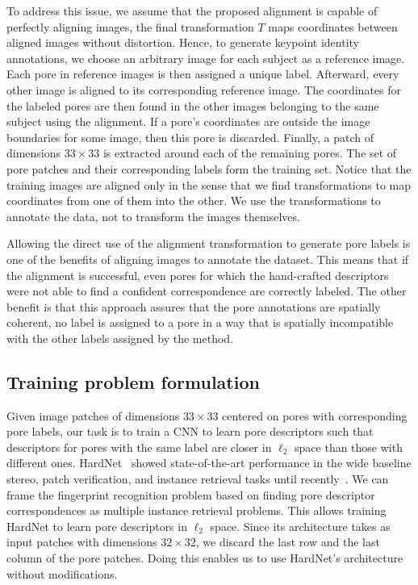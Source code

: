 \documentclass[10pt,twocolumn,letterpaper]{article}
\begin{document}
To address this issue, we assume that the proposed alignment is capable of perfectly aligning images, \ie the final transformation $T$ maps coordinates between aligned images without distortion.
Hence, to generate keypoint identity annotations, we choose an arbitrary image for each subject as a reference image.
Each pore in reference images is then assigned a unique label.
Afterward, every other image is aligned to its corresponding reference image.
The coordinates for the labeled pores are then found in the other images belonging to the same subject using the alignment.
If a pore's coordinates are outside the image boundaries for some image, then this pore is discarded.
Finally, a patch of dimensions ${33 \times 33}$ is extracted around each of the remaining pores.
The set of pore patches and their corresponding labels form the training set.
Notice that the training images are aligned only in the sense that we find transformations to map coordinates from one of them into the other.
We use the transformations to annotate the data, not to transform the images themselves.

Allowing the direct use of the alignment transformation to generate pore labels is one of the benefits of aligning images to annotate the dataset.
This means that if the alignment is successful, even pores for which the hand-crafted descriptors were not able to find a confident correspondence are correctly labeled.
The other benefit is that this approach assures that the pore annotations are spatially coherent, \ie no label is assigned to a pore in a way that is spatially incompatible with the other labels assigned by the method.

\subsection{Training problem formulation}
\label{sec:desc-train}

Given image patches of dimensions ${33 \times 33}$ centered on pores with corresponding pore labels, our task is to train a CNN to learn pore descriptors such that descriptors for pores with the same label are closer in $\ell_2$ space than those with different ones.
HardNet~\cite{hardnet} showed state-of-the-art performance in the wide baseline stereo, patch verification, and instance retrieval tasks until recently~\cite{doap}.
We can frame the fingerprint recognition problem based on finding pore descriptor correspondences as multiple instance retrieval problems.
This allows training HardNet to learn pore descriptors in $\ell_2$ space.
Since its architecture takes as input patches with dimensions ${32 \times 32}$, we discard the last row and the last column of the pore patches.
Doing this enables us to use HardNet's architecture without modifications.
\end{document}
